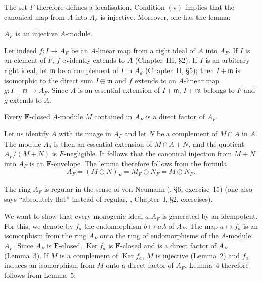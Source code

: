 The set $F$ therefore defines a localisation. Condition $(\star)$
implies that the canonical map from $A$ into $A_F$ is injective.
Moreover, one has the lemma:

\begin{lemma}
$A_F$ is an injective $A$-module.
\end{lemma}

Let indeed $f:I\to A_F$ be an $A$-linear map from a right ideal of $A$
into $A_F$. If $I$ is an element of $F$, $f$ evidently extends to $A$
(Chapter~III, \S2). If $I$ is an arbitrary right ideal, let
$\mathfrak{m}$ be a complement of $I$ in $A_d$ (Chapter~II, \S5); then
$I+\mathfrak{m}$ is isomorphic to the direct sum $I\oplus\mathfrak{m}$
and $f$ extends to an $A$-linear map $g:I+\mathfrak{m}\to A_F$. Since
$A$ is an essential extension of $I+\mathfrak{m}$, $I+\mathfrak{m}$
belongs to $F$ and $g$ extends to $A$.

\begin{lemma}
Every $\mathbf{F}$-closed $A$-module $M$ contained in $A_F$ is a direct
factor of $A_F$.
\end{lemma}

Let us identify $A$ with its image in $A_F$ and let $N$ be a complement
of $M\cap A$ in $A$. The module $A_d$ is then an essential extension of
$M\cap A+N$, and the quotient $A_F/(M+N)$ is $F$-negligible. It follows
that the canonical injection from $M+N$ into $A_F$ is an
$\mathbf{F}$-envelope. The lemma therefore follows from the formula
\[
A_F=(M\oplus N)_F=M_F\oplus N_F=M\oplus N_F.
\]

\begin{lemma}
The ring $A_F$ is regular in the sense of von
Neumann \textup{(\cite{bourbaki-algebre}, \S6, exercise~15)} (one also
says ``absolutely flat'' instead of regular, \textup{\cite{bourbaki-commutative},
Chapter~I, \S2, exercises)}.
\end{lemma}

We want to show that every monogenic ideal $a.A_F$ is generated by an
idempotent. For this, we denote by $f_a$ the endomorphism $b\mapsto a.b$
of $A_F$. The map $a\mapsto f_a$ is an isomorphism from the ring $A_F$
onto the ring of endomorphisms of the $A$-module $A_F$. Since $A_F$ is
$\mathbf{F}$-closed, $\operatorname{Ker}f_a$ is $\mathbf{F}$-closed and
is a direct factor of $A_F$ (Lemma~3). If $M$ is a complement of
$\operatorname{Ker}f_a$, $M$ is injective (Lemma~2) and $f_a$ induces an
isomorphism from $M$ onto a direct factor of $A_F$. Lemma~4 therefore
follows from Lemma~5:

